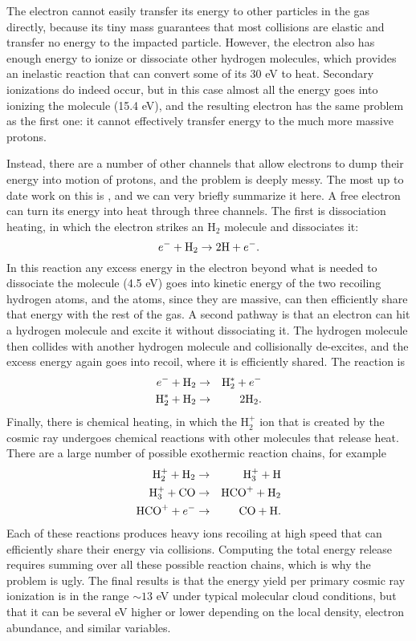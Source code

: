 The electron cannot easily transfer its energy to other particles in the gas directly, because its tiny mass guarantees that most collisions are elastic and transfer no energy to the impacted particle. However, the electron also has enough energy to ionize or dissociate other hydrogen molecules, which provides an inelastic reaction that can convert some of its 30 eV to heat. Secondary ionizations do indeed occur, but in this case almost all the energy goes into ionizing the molecule (15.4 eV), and the resulting electron has the same problem as the first one: it cannot effectively transfer energy to the much more massive protons.

Instead, there are a number of other channels that allow electrons to dump their energy into motion of protons, and the problem is deeply messy. The most up to date work on this is \citet{glassgold12a}, and we can very briefly summarize it here. A free electron can turn its energy into heat through three channels. The first is dissociation heating, in which the electron strikes an H$_2$ molecule and dissociates it:
\begin{equation}
e^- + {\rm H}_2 \rightarrow 2{\rm H} + e^{-}.
\end{equation}
In this reaction any excess energy in the electron beyond what is needed to dissociate the molecule (4.5 eV) goes into kinetic energy of the two recoiling hydrogen atoms, and the atoms, since they are massive, can then efficiently share that energy with the rest of the gas. A second pathway is that an electron can hit a hydrogen molecule and excite it without dissociating it. The hydrogen molecule then collides with another hydrogen molecule and collisionally de-excites, and the excess energy again goes into recoil, where it is efficiently shared. The reaction is
\begin{eqnarray}
e^- + {\rm H}_2 & \rightarrow & {\rm H}_2^* + e^{-} \\
{\rm H}_2^* + {\rm H}_2 & \rightarrow & 2 {\rm H}_2.
\end{eqnarray}
Finally, there is chemical heating, in which the H$_2^+$ ion that is created by the cosmic ray undergoes chemical reactions with other molecules that release heat. There are a large number of possible exothermic reaction chains, for example
\begin{eqnarray}
{\rm H}_2^+ + {\rm H}_2 & \rightarrow & {\rm H}_3^+ + {\rm H} \\
{\rm H}_3^+ + {\rm CO} & \rightarrow & {\rm HCO}^+ + {\rm H}_2 \\
{\rm HCO}^+ + e^- & \rightarrow & {\rm CO} + {\rm H}.
\end{eqnarray}
Each of these reactions produces heavy ions recoiling at high speed that can efficiently share their energy via collisions. Computing the total energy release requires summing over all these possible reaction chains, which is why the problem is ugly. The final results is that the energy yield per primary cosmic ray ionization is in the range $\sim 13$ eV under typical molecular cloud conditions, but that it can be several eV higher or lower depending on the local density, electron abundance, and similar variables.

